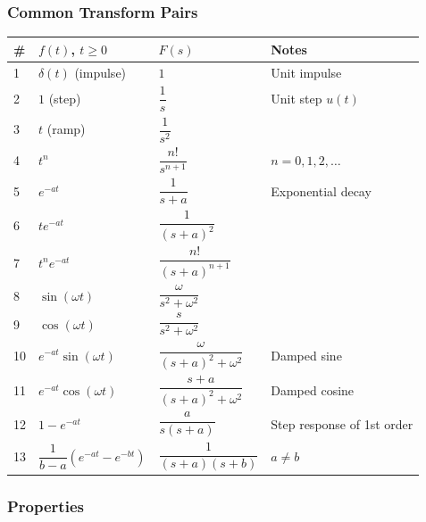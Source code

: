 \documentclass[11pt,a4paper]{book}
\begin{document}
\medskip\noindent\hrulefill\medskip

\subsubsection{Common Transform Pairs}

\begin{center}
\begin{tabular}{|l|l|l|l|}
\hline
# & $f(t)$, $t \geq 0$ & $F(s)$ & Notes \\
\hline
1 & $\delta(t)$ (impulse) & $1$ & Unit impulse \\
2 & $1$ (step) & $\dfrac{1}{s}$ & Unit step $u(t)$ \\
3 & $t$ (ramp) & $\dfrac{1}{s^2}$ \\
4 & $t^n$ & $\dfrac{n!}{s^{n+1}}$ & $n = 0, 1, 2, \ldots$ \\
5 & $e^{-at}$ & $\dfrac{1}{s+a}$ & Exponential decay \\
6 & $t e^{-at}$ & $\dfrac{1}{(s+a)^2}$ \\
7 & $t^n e^{-at}$ & $\dfrac{n!}{(s+a)^{n+1}}$ \\
8 & $\sin(\omega t)$ & $\dfrac{\omega}{s^2 + \omega^2}$ \\
9 & $\cos(\omega t)$ & $\dfrac{s}{s^2 + \omega^2}$ \\
10 & $e^{-at} \sin(\omega t)$ & $\dfrac{\omega}{(s+a)^2 + \omega^2}$ & Damped sine \\
11 & $e^{-at} \cos(\omega t)$ & $\dfrac{s+a}{(s+a)^2 + \omega^2}$ & Damped cosine \\
12 & $1 - e^{-at}$ & $\dfrac{a}{s(s+a)}$ & Step response of 1st order \\
13 & $\dfrac{1}{b-a}(e^{-at} - e^{-bt})$ & $\dfrac{1}{(s+a)(s+b)}$ & $a \neq b$ \\
\hline
\end{tabular}
\end{center}

\medskip\noindent\hrulefill\medskip

\subsubsection{Properties}
\end{document}
